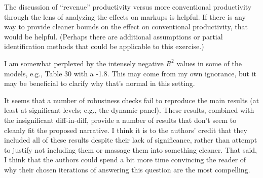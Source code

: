 \documentclass[12pt]{article}
\newif\ifdraft
\begin{document}
The discussion of ``revenue'' productivity versus more conventional 
productivity through the lens of analyzing the effects on markups 
is helpful. If there is any way to provide cleaner bounds on the effect 
on conventional productivity, that would be helpful. (Perhaps there are additional assumptions or
partial 
identification methods that could be applicable to this exercise.)

I am somewhat perplexed by the intensely negative $R^2$ values in some of 
the models, e.g., Table 30 with a -1.8. This may come from my own ignorance, 
but it may be beneficial to clarify why that's normal in this setting. 

It seems that a number of robustness checks fail to reproduce the 
main results (at least at significant levels; e.g., the dynamic panel). These results, 
combined with the insignificant diff-in-diff, provide a 
number of results that don't seem to cleanly fit the proposed 
narrative.
I think it is to the authors' credit that they included all of these 
results despite their lack of significance, rather than attempt to 
justify not including them or massage them into something cleaner. 
That said, I think that the authors could spend a bit more 
time convincing the reader of why their chosen iterations
of answering this question are the most compelling.



\ifdraft
\else
\printbibliography
\fi
\end{document}
